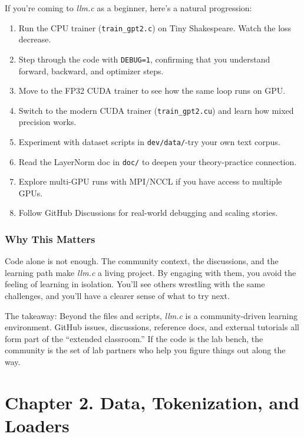 \documentclass[
  letterpaper,
  DIV=11,
  numbers=noendperiod]{scrreprt}
\providecommand{\tightlist}{%
  \setlength{\itemsep}{0pt}\setlength{\parskip}{0pt}}
\begin{document}
If you're coming to \emph{llm.c} as a beginner, here's a natural
progression:

\begin{enumerate}
\def\labelenumi{\arabic{enumi}.}
\tightlist
\item
  Run the CPU trainer (\texttt{train\_gpt2.c}) on Tiny Shakespeare.
  Watch the loss decrease.
\item
  Step through the code with \texttt{DEBUG=1}, confirming that you
  understand forward, backward, and optimizer steps.
\item
  Move to the FP32 CUDA trainer to see how the same loop runs on GPU.
\item
  Switch to the modern CUDA trainer (\texttt{train\_gpt2.cu}) and learn
  how mixed precision works.
\item
  Experiment with dataset scripts in \texttt{dev/data/}-try your own
  text corpus.
\item
  Read the LayerNorm doc in \texttt{doc/} to deepen your theory-practice
  connection.
\item
  Explore multi-GPU runs with MPI/NCCL if you have access to multiple
  GPUs.
\item
  Follow GitHub Discussions for real-world debugging and scaling
  stories.
\end{enumerate}

\subsubsection{Why This Matters}\label{why-this-matters}

Code alone is not enough. The community context, the discussions, and
the learning path make \emph{llm.c} a living project. By engaging with
them, you avoid the feeling of learning in isolation. You'll see others
wrestling with the same challenges, and you'll have a clearer sense of
what to try next.

The takeaway: Beyond the files and scripts, \emph{llm.c} is a
community-driven learning environment. GitHub issues, discussions,
reference docs, and external tutorials all form part of the ``extended
classroom.'' If the code is the lab bench, the community is the set of
lab partners who help you figure things out along the way.

\section{Chapter 2. Data, Tokenization, and
Loaders}\label{chapter-2.-data-tokenization-and-loaders}
\end{document}
